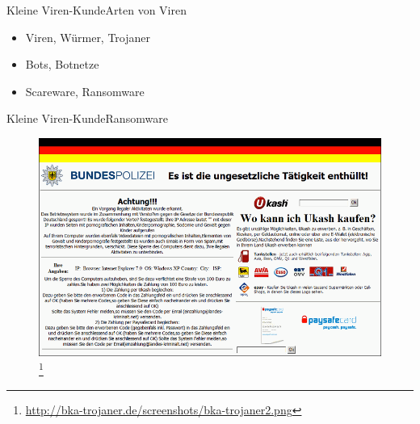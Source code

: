 \documentclass[10pt]{beamer}
\begin{document}
\begin{frame}{Kleine Viren-Kunde}{Arten von Viren}
\begin{itemize}
	\item Viren, Würmer, Trojaner
	\item Bots, Botnetze
	\item Scareware, Ransomware
\end{itemize}
\end{frame}







\begin{frame}{Kleine Viren-Kunde}{Ransomware}

	\begin{figure}[p]
		\centering
		\includegraphics[scale=0.25]{bka-trojaner.png}
		\let\thefootnote\relax\footnote{\url{http://bka-trojaner.de/screenshots/bka-trojaner2.png}}
	\end{figure}

\end{frame}
\end{document}
